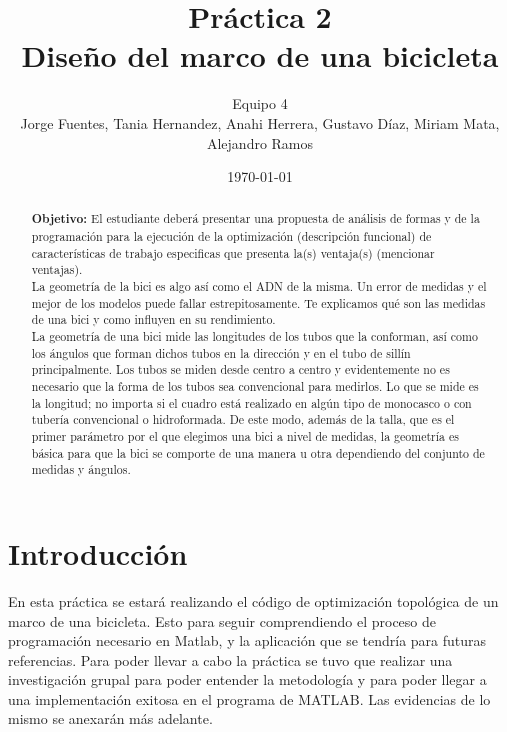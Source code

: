 \documentclass{article}
\author{Equipo 4 \\Jorge  Fuentes, Tania  Hernandez,
 Anahi Herrera, Gustavo  Díaz, Miriam  Mata, Alejandro Ramos} %
\title{Práctica 2 \\ Diseño del marco de una bicicleta} %
\date{\today}
\begin{document}
\maketitle %
\begin{abstract} %
\textbf{Objetivo:} El estudiante deberá presentar una propuesta de análisis de formas y de la programación para la ejecución de la optimización (descripción funcional) de características de trabajo especificas que presenta la(s) ventaja(s) (mencionar ventajas).\\
La geometría de la bici es algo así como el ADN de la misma. Un error de medidas y el mejor de los modelos puede fallar estrepitosamente. Te explicamos qué son las medidas de una bici y como influyen en su rendimiento.\\
La geometría de una bici mide las longitudes de los tubos que la conforman, así como los ángulos que forman dichos tubos en la dirección y en el tubo de sillín principalmente. Los tubos se miden desde centro a centro y evidentemente no es necesario que la forma de los tubos sea convencional para medirlos. Lo que se mide es la longitud; no importa si el cuadro está realizado en algún tipo de monocasco o con tubería convencional o hidroformada. De este modo, además de la talla, que es el primer parámetro por el que elegimos una bici a nivel de medidas, la geometría es básica para que la bici se comporte de una manera u otra dependiendo del conjunto de medidas y ángulos.\\
\end{abstract}
\newpage
\tableofcontents
\newpage
\section{Introducción}\label{intro} %
En esta práctica se estará realizando el código de optimización topológica de un marco de una bicicleta. Esto para seguir comprendiendo el proceso de programación necesario en Matlab, y la aplicación que se tendría para futuras referencias.
Para poder llevar a cabo la práctica se tuvo que realizar una investigación grupal para poder entender la metodología y para poder llegar a una implementación exitosa en el programa de MATLAB. Las evidencias de lo mismo se anexarán más adelante.


\end{document}
